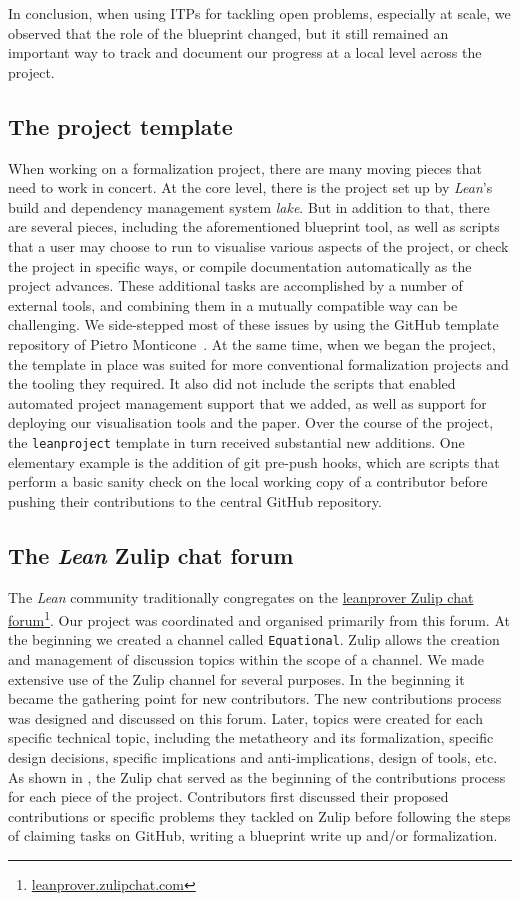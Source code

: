 In conclusion, when using ITPs for tackling open problems, especially at scale, we observed that the role of the blueprint changed, but it still remained an important way to track and document our progress at a local level across the project.

\subsection{The project template}
When working on a formalization project, there are many moving pieces that need to work in concert. At the core level, there is the project set up by \emph{Lean}'s build and dependency management system \emph{lake}. But in addition to that, there are several pieces, including the aforementioned blueprint tool, as well as scripts that a user may choose to run to visualise various aspects of the project, or check the project in specific ways, or compile documentation automatically as the project advances. These additional tasks are accomplished by a number of external tools, and combining them in a mutually compatible way can be challenging. We side-stepped most of these issues by using the GitHub template repository of Pietro Monticone~\cite{Monticone_LeanProject_2025}. At the same time, when we began the project, the template in place was suited for more conventional formalization projects and the tooling they required. It also did not include the scripts that enabled automated project management support that we added, as well as support for deploying our visualisation tools and the paper. Over the course of the project, the \texttt{leanproject} template in turn received substantial new additions. One elementary example is the addition of git pre-push hooks, which are scripts that perform a basic sanity check on the local working copy of a contributor before pushing their contributions to the central GitHub repository.

\subsection{The \emph{Lean} Zulip chat forum}
The \emph{Lean} community traditionally congregates on the \href{leanprover.zulipchat.com}{leanprover Zulip chat forum}\footnote{\url{leanprover.zulipchat.com}}. Our project was coordinated and organised primarily from this forum. At the beginning we created a channel called \texttt{Equational}. Zulip allows the creation and management of discussion topics within the scope of a channel. We made extensive use of the Zulip channel for several purposes. In the beginning it became the gathering point for new contributors. The new contributions process was designed and discussed on this forum. Later, topics were created for each specific technical topic, including the metatheory and its formalization, specific design decisions, specific implications and anti-implications, design of tools, etc. As shown in , the Zulip chat served as the beginning of the contributions process for each piece of the project. Contributors first discussed their proposed contributions or specific problems they tackled on Zulip before following the steps of claiming tasks on GitHub, writing a blueprint write up and/or formalization.

